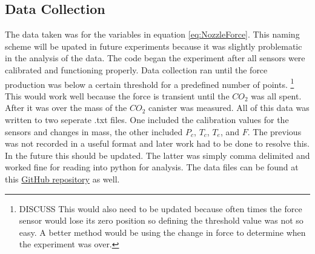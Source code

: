 \subsection{Data Collection}
The data taken was for the variables in equation \ref{eq:NozzleForce}. 
This naming scheme will be upated in future experiments because it was slightly problematic in the analysis of the data. The code began the experiment after all sensors were calibrated and functioning properly. Data collection ran until the force production was below a certain threshold for a predefined number of points. \footnote{DISCUSS This would also need to be updated because often times the force sensor would lose its zero position so defining the threshold value was not so easy. A better method would be using the change in force to determine when the experiment was over.} This would work well because the force is transient until the $CO_2$ was all spent. After it was over the mass of the $CO_2$ canister was measured. All of this data was written to two seperate .txt files. One included the calibration values for the sensors and changes in mass, the other included $P_c$, $T_c$, $T_e$, and $F$. The previous was not recorded in a useful format and later work had to be done to resolve this. In the future this should be updated. The latter was simply comma delimited and worked fine for reading into python for analysis. The data files can be found at this \href{https://github.com/maxmhuggins/RCS_HAB/tree/master/On_Ground_Testing/Data_and_Analysis/Experimental_Data_Analysis/Refined_Data_Files}{GitHub repository} as well.
